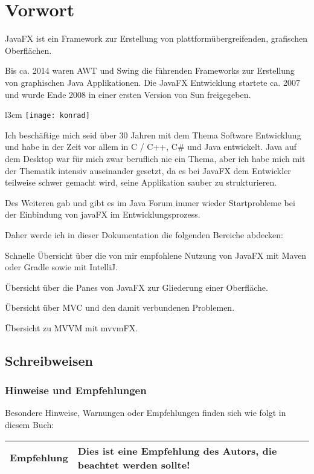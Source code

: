 \section{Vorwort}

JavaFX ist ein Framework zur Erstellung von plattformübergreifenden, grafischen Oberflächen.

Bis ca. 2014 waren AWT und Swing die führenden Frameworks zur Erstellung von graphischen Java Applikationen. Die JavaFX Entwicklung 
startete ca. 2007 und wurde Ende 2008 in einer ersten Version von Sun freigegeben.

\begin{wrapfigure}{l}{3cm}
    \texttt{[image: konrad]}
\end{wrapfigure}

Ich beschäftige mich seid über 30 Jahren mit dem Thema Software Entwicklung und habe in der Zeit vor allem in C / C++, C# und Java entwickelt.
Java auf dem Desktop war für mich zwar beruflich nie ein Thema, aber ich habe mich mit der Thematik intensiv auseinander gesetzt, da es bei
JavaFX dem Entwickler teilweise schwer gemacht wird, seine Applikation sauber zu strukturieren.

Des Weiteren gab und gibt es im Java Forum immer wieder Startprobleme bei der Einbindung von javaFX im Entwicklungsprozess.

Daher werde ich in dieser Dokumentation die folgenden Bereiche abdecken:

Schnelle Übersicht über die von mir empfohlene Nutzung von JavaFX mit Maven oder Gradle sowie mit IntelliJ.

Übersicht über die Panes von JavaFX zur Gliederung einer Oberfläche.

Übersicht über MVC und den damit verbundenen Problemen.

Übersicht zu MVVM mit mvvmFX.

\subsection{Schreibweisen}
\subsubsection{Hinweise und Empfehlungen}
Besondere Hinweise, Warnungen oder Empfehlungen finden sich wie folgt in diesem Buch:

\begin{tabular}[h]{|p{2cm}|p{9cm}|}
\hline
\textbf{Empfehlung} & Dies ist eine Empfehlung des Autors, die beachtet werden sollte! \\
\hline
\end{tabular}

